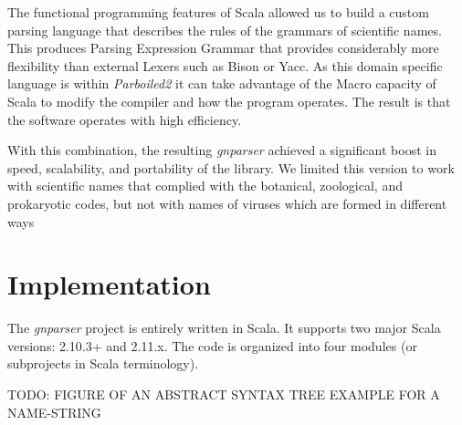 \documentclass{bmcart}
\begin{document}
The functional programming features of Scala allowed us to build a custom
parsing language that describes the rules of the grammars of scientific names.
This produces Parsing Expression Grammar that provides considerably more
flexibility than external Lexers such as Bison or Yacc. As this domain specific
language is within \textit{Parboiled2} it can take advantage of the Macro
capacity of Scala \cite{Burmako:2013:SML:2489837.2489840} to modify the
compiler and how the program operates. The result is that the software operates
with high efficiency.

With this combination, the resulting \textit{gnparser} achieved a significant
boost in speed, scalability, and portability of the library.  We limited this
version to work with scientific names that complied with the botanical,
zoological, and prokaryotic codes, but not with names of viruses which are
formed in different ways \cite{ICTV, Patterson:inpress-a}

\section*{Implementation}

The \textit{gnparser} project is entirely written in Scala. It supports two
major Scala versions: 2.10.3+ and 2.11.x. The code is organized into four
modules (or subprojects in Scala terminology).

TODO: FIGURE OF AN ABSTRACT SYNTAX TREE EXAMPLE FOR A NAME-STRING
\end{document}
